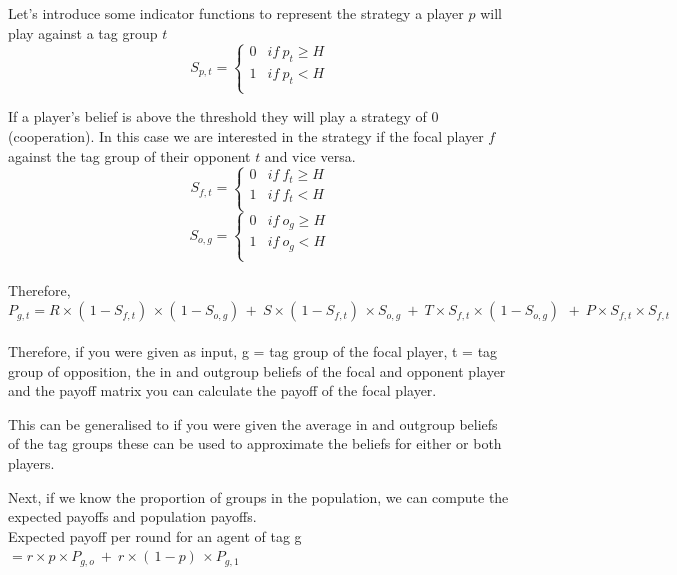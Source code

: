 \documentclass[]{llncs}
\begin{document}
Let's introduce some indicator functions to represent the strategy a player $p$ will play against a tag group $t$ 
\[
   S_{p,t} =  \begin{cases}
        0 & if\ p_t \geq H \\
        1 & if\ p_t < H \\
    \end{cases}
\]

If a player's belief is above the threshold they will play a strategy of 0 (cooperation). 
In this case we are interested in the strategy if the focal player $f$ against the tag group of their opponent $t$ and vice versa.
\[
   S_{f,t} =  \begin{cases}
        0 & if\ f_t \geq H \\
        1 & if\ f_t < H  \\
    \end{cases}
\]
\[
   S_{o,g} =  \begin{cases}
        0 & if\ o_g\geq H \\
        1 & if\ o_g < H  \\
    \end{cases}
\]
\\
Therefore, \\
$P_{g,t} = R \times ( \, 1-S_{f,t}) \,  \times ( \, 1-S_{o,g}) \, + \ S \times ( \, 1- S_{f,t}) \, \times S_{o,g} \ + \ T \times S_{f,t} \times ( \, 1-S_{o,g}) \,\ + \ P \times S_{f,t} \times S_{f,t} $
\\
\\
Therefore, if you were given as input, g = tag group of the focal player, t = tag group of opposition, the in and outgroup beliefs of the focal and opponent player and the payoff matrix you can calculate the payoff of the focal player. 

This can be generalised to if you were given the average in and outgroup beliefs of the tag groups these can be used to approximate the beliefs for either or both players. 

Next, if we know the proportion of groups in the population, we can compute the expected payoffs and population payoffs. 
\\

Expected payoff per round for an agent of tag g $ = r \times p \times P_{g,o} \ + \ r\times(\, 1 - p )\, \times P_{g,1} $
\end{document}
